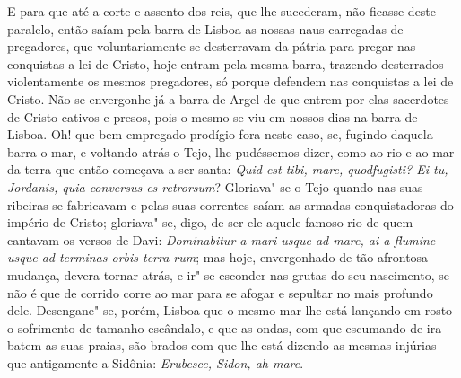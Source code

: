 E para que até a corte e assento dos reis, que lhe sucederam, não
ficasse deste paralelo, então saíam pela barra de Lisboa as nossas naus
carregadas de pregadores, que voluntariamente se desterravam da pátria
para pregar nas conquistas a lei de Cristo, hoje entram pela mesma
barra, trazendo desterrados violentamente os mesmos pregadores, só
porque defendem nas conquistas a lei de Cristo. Não se envergonhe já a
barra de Argel de que entrem por elas sacerdotes de Cristo cativos e
presos, pois o mesmo se viu em nossos dias na barra de Lisboa. Oh! que
bem empregado prodígio fora neste caso, se, fugindo daquela barra o mar,
e voltando atrás o Tejo, lhe pudéssemos dizer, como ao rio e ao mar da
terra que então começava a ser santa: \emph{Quid est tibi, mare,
quodfugisti? Ei tu, Jordanis, quia conversus es retrorsum}?
Gloriava"-se o Tejo quando nas suas ribeiras se fabricavam e pelas suas
correntes saíam as armadas conquistadoras do império de Cristo;
gloriava"-se, digo, de ser ele aquele famoso rio de quem cantavam os
versos de Davi: \emph{Dominabitur a mari usque ad mare, ai a flumine
usque ad terminas orbis terra rum}; mas hoje, envergonhado
de tão afrontosa mudança, devera tornar atrás, e ir"-se esconder nas
grutas do seu nascimento, se não é que de corrido corre ao mar para se
afogar e sepultar no mais profundo dele.
Desengane"-se, porém, Lisboa que o mesmo mar lhe está lançando em rosto o
sofrimento de tamanho escândalo, e que as ondas, com que escumando de
ira batem as suas praias, são brados com que lhe está dizendo as mesmas
injúrias que antigamente a Sidônia: \emph{Erubesce, Sidon, ah mare}.

